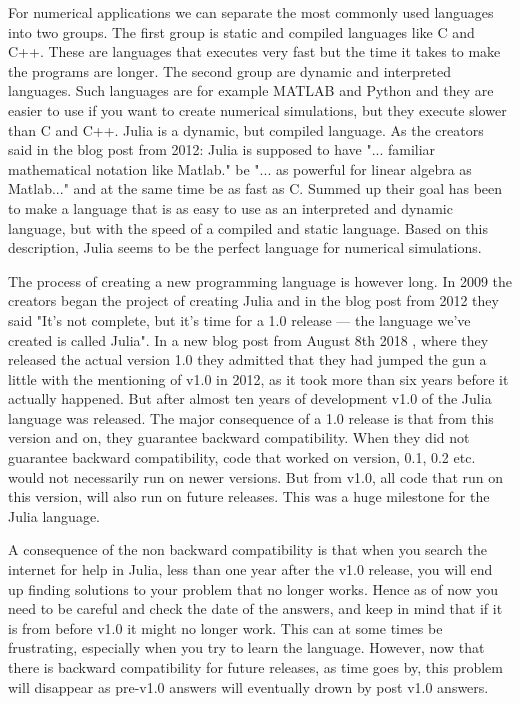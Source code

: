 For numerical applications we can separate the most commonly used languages into two groups. The first group is static and compiled languages like C and C++. These are languages that executes very fast but the time it takes to make the programs are longer. The second group are dynamic and interpreted languages. Such languages are for example MATLAB and Python and they are easier to use if you want to create numerical simulations, but they execute slower than C and C++. Julia is a dynamic, but compiled language. As the creators said in the blog post from 2012: Julia is supposed to have "... familiar mathematical notation like Matlab." be "... as  powerful  for  linear  algebra  as Matlab..." and at the same time be as fast as C. Summed up their goal has been to make a language that is as easy to use as an interpreted and dynamic language, but with the speed of a compiled and static language. Based on this description, Julia seems to be the perfect language for numerical simulations.

The process of creating a new programming language is however long. In 2009 the creators began the project of creating Julia and in the blog post \emph{\citep{juliaBlogRelease2012}} from 2012 they said "It’s not complete, but it’s time for a 1.0 release — the language we’ve created is called Julia". In a new blog post from August 8th 2018 \emph{\cite{juliaBlogReleaseV1.0}}, where they released the actual version 1.0 they admitted that they had jumped the gun a little with the mentioning of v1.0 in 2012, as it took more than six years before it actually happened. But after almost ten years of development v1.0 of the Julia language was released. The major consequence of a 1.0 release is that from this version and on, they guarantee backward compatibility. When they did not guarantee backward compatibility, code that worked on version, 0.1, 0.2 etc. would not necessarily run on newer versions. But from v1.0, all code that run on this version, will also run on future releases. This was a huge milestone for the Julia language. 

A consequence of the non backward compatibility is that when you search the internet for help in Julia, less than one year after the v1.0 release, you will end up finding solutions to your problem that no longer works. Hence as of now you need to be careful and check the date of the answers, and keep in mind that if it is from before v1.0 it might no longer work. This can at some times be frustrating, especially when you try to learn the language. However, now that there is backward compatibility for future releases, as time goes by, this problem will disappear as pre-v1.0 answers will eventually drown by post v1.0 answers.

